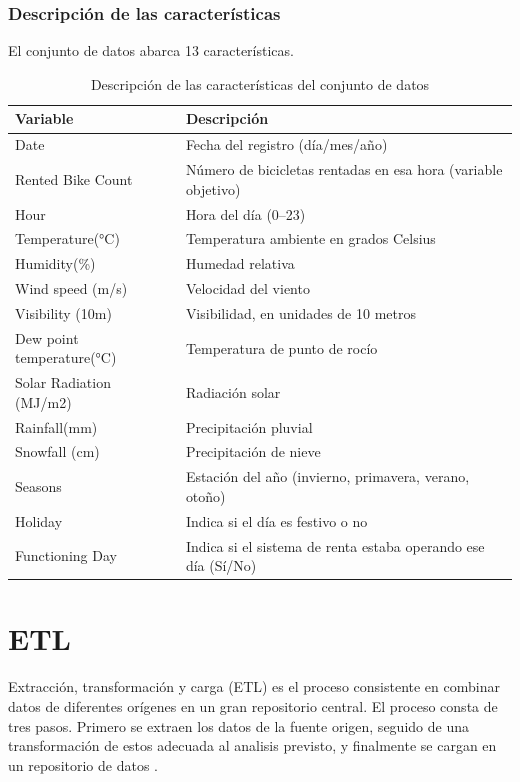 \documentclass[10pt,journal,compsoc]{IEEEtran}
\begin{document}
\subsubsection{Descripción de las características}
El conjunto de datos abarca 13 características. 
\begin{table}[H]
\centering
\caption{Descripción de las características del conjunto de datos}
\label{tab:features}
\begin{tabular}{|l|p{5cm}|}
\hline
\textbf{Variable} & \textbf{Descripción} \\
\hline
Date & Fecha del registro (día/mes/año) \\
\hline
Rented Bike Count & Número de bicicletas rentadas en esa hora (variable objetivo) \\
\hline
Hour & Hora del día (0--23) \\
\hline
Temperature(°C) & Temperatura ambiente en grados Celsius \\
\hline
Humidity(\%) & Humedad relativa \\
\hline
Wind speed (m/s) & Velocidad del viento \\
\hline
Visibility (10m) & Visibilidad, en unidades de 10 metros \\
\hline
Dew point temperature(°C) & Temperatura de punto de rocío \\
\hline
Solar Radiation (MJ/m2) & Radiación solar \\
\hline
Rainfall(mm) & Precipitación pluvial \\
\hline
Snowfall (cm) & Precipitación de nieve \\
\hline
Seasons & Estación del año (invierno, primavera, verano, otoño) \\
\hline
Holiday & Indica si el día es festivo o no \\
\hline
Functioning Day & Indica si el sistema de renta estaba operando ese día (Sí/No) \\
\hline
\end{tabular}
\end{table}


\section{ETL}
Extracción, transformación y carga (ETL) es el proceso consistente en combinar datos de diferentes orígenes en un gran repositorio central. El proceso consta de tres pasos. Primero se extraen los datos de la fuente origen, seguido de una transformación de estos adecuada al analisis previsto, y finalmente se cargan en un repositorio de datos \cite{aws_etl}.  
\end{document}
